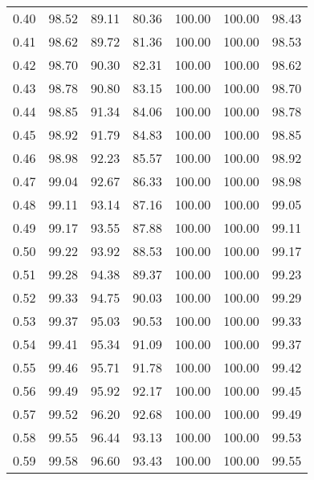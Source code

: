 \begin{tabular}{|c|c|c|c|c|c|c|}
      0.40 &     98.52 &     89.11 &      80.36 &  100.00 &     100.00 &         98.43 \\
      0.41 &     98.62 &     89.72 &      81.36 &  100.00 &     100.00 &         98.53 \\
      0.42 &     98.70 &     90.30 &      82.31 &  100.00 &     100.00 &         98.62 \\
      0.43 &     98.78 &     90.80 &      83.15 &  100.00 &     100.00 &         98.70 \\
      0.44 &     98.85 &     91.34 &      84.06 &  100.00 &     100.00 &         98.78 \\
      0.45 &     98.92 &     91.79 &      84.83 &  100.00 &     100.00 &         98.85 \\
      0.46 &     98.98 &     92.23 &      85.57 &  100.00 &     100.00 &         98.92 \\
      0.47 &     99.04 &     92.67 &      86.33 &  100.00 &     100.00 &         98.98 \\
      0.48 &     99.11 &     93.14 &      87.16 &  100.00 &     100.00 &         99.05 \\
      0.49 &     99.17 &     93.55 &      87.88 &  100.00 &     100.00 &         99.11 \\
      0.50 &     99.22 &     93.92 &      88.53 &  100.00 &     100.00 &         99.17 \\
      0.51 &     99.28 &     94.38 &      89.37 &  100.00 &     100.00 &         99.23 \\
      0.52 &     99.33 &     94.75 &      90.03 &  100.00 &     100.00 &         99.29 \\
      0.53 &     99.37 &     95.03 &      90.53 &  100.00 &     100.00 &         99.33 \\
      0.54 &     99.41 &     95.34 &      91.09 &  100.00 &     100.00 &         99.37 \\
      0.55 &     99.46 &     95.71 &      91.78 &  100.00 &     100.00 &         99.42 \\
      0.56 &     99.49 &     95.92 &      92.17 &  100.00 &     100.00 &         99.45 \\
      0.57 &     99.52 &     96.20 &      92.68 &  100.00 &     100.00 &         99.49 \\
      0.58 &     99.55 &     96.44 &      93.13 &  100.00 &     100.00 &         99.53 \\
      0.59 &     99.58 &     96.60 &      93.43 &  100.00 &     100.00 &         99.55 \\

\end{tabular}
